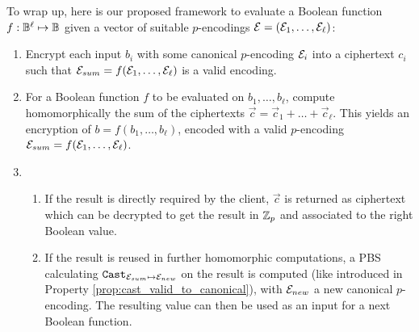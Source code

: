 To wrap up, here is our proposed framework to evaluate a Boolean function $f: \mathbb{B}^\ell \mapsto \mathbb{B}$ given a vector of suitable $p$-encodings $\mathcal{E} = (\mathcal{E}_1, \dots, \mathcal{E}_\ell)$:

\begin{enumerate}
\item Encrypt each input $b_i$ with some canonical $p$-encoding $\mathcal{E}_i$ into a ciphertext $c_i$ such that $\mathcal{E}_{sum} = f(\mathcal{E}_1, \dots, \mathcal{E}_\ell)$ is a valid encoding.
\item For a Boolean function $f$ to be evaluated on $b_1, \dots, b_\ell$, compute homomorphically the sum of the ciphertexts $\vec c = \vec{c}_1 + \dots + \vec{c}_\ell$. This yields an encryption of $b = f(b_1, \dots, b_\ell)$, encoded with a valid $p$-encoding $\mathcal{E}_{sum} = f(\mathcal{E}_1, \dots, \mathcal{E}_\ell)$.
\item \begin{enumerate}
    \item If the result is directly required by the client, $\vec c$ is returned as ciphertext which can be decrypted to get the result in $\mathbb{Z}_p$ and associated to the right Boolean value.
    \item If the result is reused in further homomorphic computations, a PBS calculating $\texttt{Cast}_{\mathcal{E}_{sum} \mapsto \mathcal{E}_{new}}$ on the result is computed (like introduced in Property \ref{prop:cast_valid_to_canonical}), with $\mathcal{E}_{new}$ a new canonical $p$-encoding. The resulting value can then be used as an input for a next Boolean function.
    \end{enumerate}
\end{enumerate}


